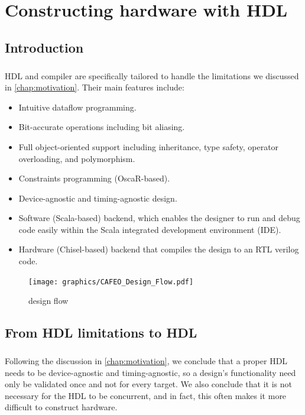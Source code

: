 
\chapter{Constructing hardware with \cf HDL}
\label{chap:CAFEO}
\section{Introduction}

\paragraph{}\cf HDL and compiler are specifically tailored to handle the limitations we discussed in \autoref{chap:motivation}. Their main features include:
\begin{itemize}
\item Intuitive dataflow programming.
\item Bit-accurate operations including bit aliasing.
\item Full object-oriented support including inheritance, type safety, operator overloading, and polymorphism.
\item Constraints programming (OscaR\cite{team3258oscar}-based).
\item Device-agnostic and timing-agnostic design.
\item Software (Scala-based) backend, which enables the designer to run and debug code easily within the Scala integrated development environment (IDE).
\item Hardware (Chisel\cite{bachrach2012chisel}-based) backend that compiles the design to an RTL verilog code.
\end{itemize}

\begin{figure}[htb]
  \centering
  \texttt{[image: graphics/CAFEO\_Design\_Flow.pdf]}
  \caption{\cf design flow}\label{fig:CAFEO design flow}
\end{figure}


\section{From HDL limitations to \cf HDL}
\paragraph{}Following the discussion in \autoref{chap:motivation}, we conclude that a proper HDL needs to be device-agnostic and timing-agnostic, so a design's functionality need only be validated once and not for every target. We also conclude that it is not necessary for the HDL to be concurrent, and in fact, this often makes it more difficult to construct hardware. 
